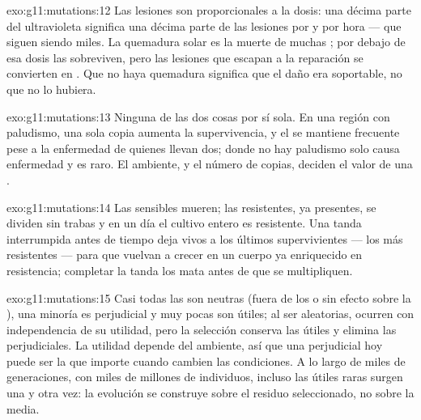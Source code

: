 \begin{solution}{exo:g11:mutations:12}
Las lesiones son proporcionales a la dosis: una décima parte del
ultravioleta significa una décima parte de las lesiones por  y
por hora --- que siguen siendo miles. La quemadura solar es la muerte
de muchas ; por debajo de esa dosis las  sobreviven, pero
las lesiones que escapan a la reparación se convierten en .
Que no haya quemadura significa que el daño era soportable, no que no
lo hubiera.
\end{solution}

\begin{solution}{exo:g11:mutations:13}
Ninguna de las dos cosas por sí sola. En una región con paludismo, una
sola copia aumenta la supervivencia, y el  se mantiene frecuente
pese a la enfermedad de quienes llevan dos; donde no hay paludismo solo
causa enfermedad y es raro. El ambiente, y el número de copias, deciden
el valor de una .
\end{solution}

\begin{solution}{exo:g11:mutations:14}
Las  sensibles mueren; las resistentes, ya presentes, se dividen
sin trabas y en un día el cultivo entero es resistente. Una tanda
interrumpida antes de tiempo deja vivos a los últimos supervivientes
--- los más resistentes --- para que vuelvan a crecer en un cuerpo ya
enriquecido en resistencia; completar la tanda los mata antes de que se
multipliquen.
\end{solution}

\begin{solution}{exo:g11:mutations:15}
Casi todas las  son neutras (fuera de los  o sin efecto
sobre la ), una minoría es perjudicial y muy pocas son útiles;
al ser aleatorias, ocurren con independencia de su utilidad, pero la
selección conserva las útiles y elimina las perjudiciales. La utilidad
depende del ambiente, así que una  perjudicial hoy puede ser la
que importe cuando cambien las condiciones. A lo largo de miles de
generaciones, con miles de millones de individuos, incluso las
 útiles raras surgen una y otra vez: la evolución se
construye sobre el residuo seleccionado, no sobre la  media.
\end{solution}

